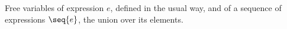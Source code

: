 Free variables of expression $e$, defined in the usual way, and of a sequence of expressions $\seq{e}$, the union over its elements.
